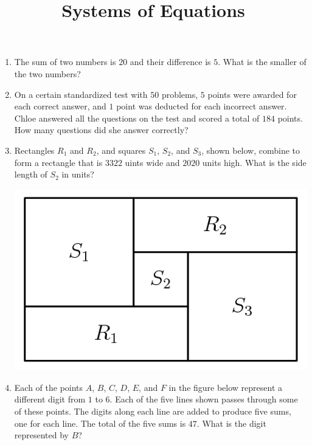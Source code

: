 \documentclass{article}
\title{Systems of Equations}
\author{}
\date{}
\begin{document}
\maketitle
\begin{enumerate}
    \item The sum of two numbers is $20$ and their difference is $5$.
        What is the smaller of the two numbers?
        \vspace{3cm}
    \item On a certain standardized test with $50$ problems, $5$ points were awarded for each correct answer, and $1$ point was deducted for each incorrect answer.
        Chloe answered all the questions on the test and scored a total of $184$ points.
        How many questions did she answer correctly?
        \vspace{3cm}
    \item Rectangles $R_1$ and $R_2$, and squares $S_1$, $S_2$, and $S_3$, shown below, combine to form a rectangle that is $3322$ uints wide and $2020$ units high.
        What is the side length of $S_2$ in units?
        \begin{center}
            \includegraphics[scale=0.2]{1-1rectangles.png}
        \end{center}
        \vspace{3cm}
    \item Each of the points $A$, $B$, $C$, $D$, $E$, and $F$ in the figure below represent a different digit from $1$ to $6$.
        Each of the five lines shown passes through some of these points.
        The digits along each line are added to produce five sums, one for each line.
        The total of the five sums is $47$.
        What is the digit represented by $B$?
        \begin{center}

\end{center}
\end{enumerate}
\end{document}
